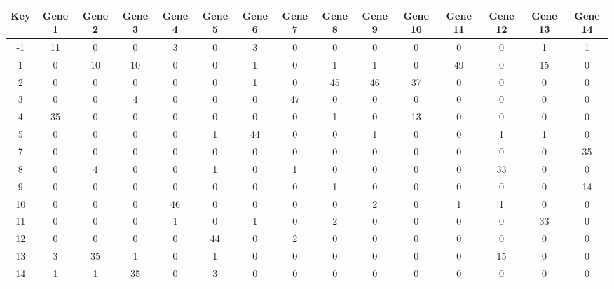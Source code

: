 \begin{tabular}{|c|c|c|c|c|c|c|c|c|c|c|c|c|c|c|}
\hline
Key & Gene 1 & Gene 2 & Gene 3 & Gene 4 & Gene 5 & Gene 6 & Gene 7 & Gene 8 & Gene 9 & Gene 10 & Gene 11 & Gene 12 & Gene 13 & Gene 14 \\
\hline
-1 & 11 & 0 & 0 & 3 & 0 & 3 & 0 & 0 & 0 & 0 & 0 & 0 & 1 & 1 \\
1 & 0 & 10 & 10 & 0 & 0 & 1 & 0 & 1 & 1 & 0 & 49 & 0 & 15 & 0 \\
2 & 0 & 0 & 0 & 0 & 0 & 1 & 0 & 45 & 46 & 37 & 0 & 0 & 0 & 0 \\
3 & 0 & 0 & 4 & 0 & 0 & 0 & 47 & 0 & 0 & 0 & 0 & 0 & 0 & 0 \\
4 & 35 & 0 & 0 & 0 & 0 & 0 & 0 & 1 & 0 & 13 & 0 & 0 & 0 & 0 \\
5 & 0 & 0 & 0 & 0 & 1 & 44 & 0 & 0 & 1 & 0 & 0 & 1 & 1 & 0 \\
7 & 0 & 0 & 0 & 0 & 0 & 0 & 0 & 0 & 0 & 0 & 0 & 0 & 0 & 35 \\
8 & 0 & 4 & 0 & 0 & 1 & 0 & 1 & 0 & 0 & 0 & 0 & 33 & 0 & 0 \\
9 & 0 & 0 & 0 & 0 & 0 & 0 & 0 & 1 & 0 & 0 & 0 & 0 & 0 & 14 \\
10 & 0 & 0 & 0 & 46 & 0 & 0 & 0 & 0 & 2 & 0 & 1 & 1 & 0 & 0 \\
11 & 0 & 0 & 0 & 1 & 0 & 1 & 0 & 2 & 0 & 0 & 0 & 0 & 33 & 0 \\
12 & 0 & 0 & 0 & 0 & 44 & 0 & 2 & 0 & 0 & 0 & 0 & 0 & 0 & 0 \\
13 & 3 & 35 & 1 & 0 & 1 & 0 & 0 & 0 & 0 & 0 & 0 & 15 & 0 & 0 \\
14 & 1 & 1 & 35 & 0 & 3 & 0 & 0 & 0 & 0 & 0 & 0 & 0 & 0 & 0 \\
\hline
\end{tabular}